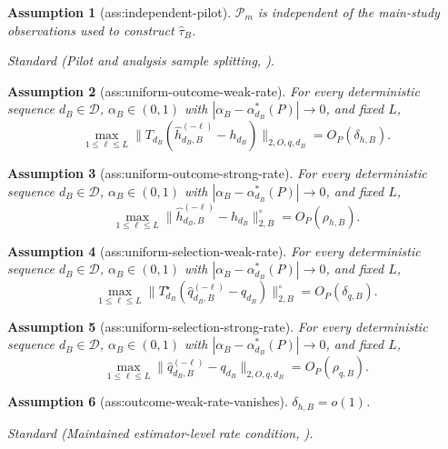 \documentclass{article}
\newtheorem{assumption}{Assumption}
\begin{document}
\begin{assumption}[ass:independent-pilot]\label{ass:independent-pilot}
\(\mathcal P_m\) is independent of the main-study observations used to construct \(\widehat\tau_B\).
\par\smallskip\noindent\emph{Standard} (Pilot and analysis sample splitting, \cite{ChernozhukovEtAl2018}).
\end{assumption}

\begin{assumption}[ass:uniform-outcome-weak-rate]\label{ass:uniform-outcome-weak-rate}
For every deterministic sequence \(d_B\in\mathcal D\), \(\alpha_B\in(0,1)\) with \(|\alpha_B-\alpha_{d_B}^*(P)|\to0\), and fixed \(L\),
\[
\max_{1\le\ell\le L}\|T_{d_B}(\widehat h_{d_B,B}^{(-\ell)}-h_{d_B})\|_{2,O,q,d_B}=O_P(\delta_{h,B}).
\]
\end{assumption}

\begin{assumption}[ass:uniform-outcome-strong-rate]\label{ass:uniform-outcome-strong-rate}
For every deterministic sequence \(d_B\in\mathcal D\), \(\alpha_B\in(0,1)\) with \(|\alpha_B-\alpha_{d_B}^*(P)|\to0\), and fixed \(L\),
\[
\max_{1\le\ell\le L}\|\widehat h_{d_B,B}^{(-\ell)}-h_{d_B}\|_{2,B}^{\circ}=O_P(\rho_{h,B}).
\]
\end{assumption}

\begin{assumption}[ass:uniform-selection-weak-rate]\label{ass:uniform-selection-weak-rate}
For every deterministic sequence \(d_B\in\mathcal D\), \(\alpha_B\in(0,1)\) with \(|\alpha_B-\alpha_{d_B}^*(P)|\to0\), and fixed \(L\),
\[
\max_{1\le\ell\le L}\|T_{d_B}^{\star}(\widehat q_{d_B,B}^{(-\ell)}-q_{d_B})\|_{2,B}^{\circ}=O_P(\delta_{q,B}).
\]
\end{assumption}

\begin{assumption}[ass:uniform-selection-strong-rate]\label{ass:uniform-selection-strong-rate}
For every deterministic sequence \(d_B\in\mathcal D\), \(\alpha_B\in(0,1)\) with \(|\alpha_B-\alpha_{d_B}^*(P)|\to0\), and fixed \(L\),
\[
\max_{1\le\ell\le L}\|\widehat q_{d_B,B}^{(-\ell)}-q_{d_B}\|_{2,O,q,d_B}=O_P(\rho_{q,B}).
\]
\end{assumption}

\begin{assumption}[ass:outcome-weak-rate-vanishes]\label{ass:outcome-weak-rate-vanishes}
\(\delta_{h,B}=o(1)\).
\par\smallskip\noindent\emph{Standard} (Maintained estimator-level rate condition, \cite{ChernozhukovEtAl2018}).
\end{assumption}
\end{document}
